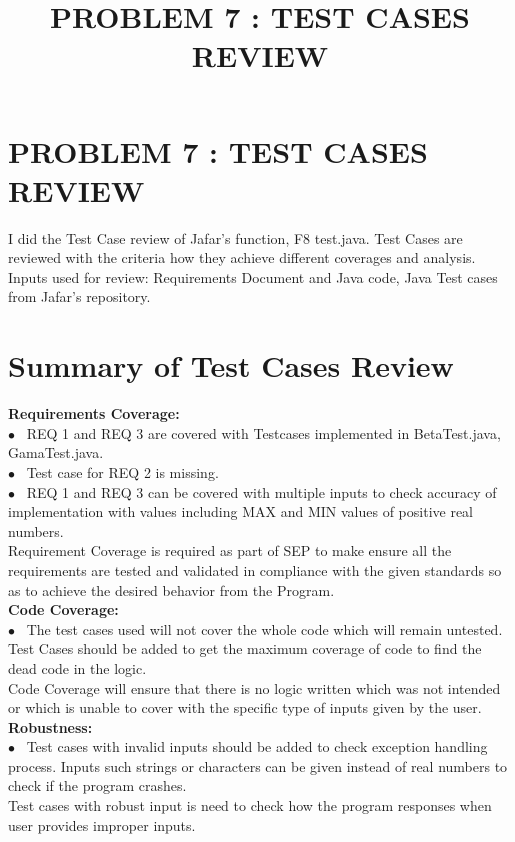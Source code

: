 \documentclass[10pt]{article}
\title{{\large\textbf{\normalsize PROBLEM 7 : TEST CASES REVIEW }}}
\begin{document}
\section*{{PROBLEM 7 : TEST CASES REVIEW}}
    I did the Test Case review of Jafar's function, F8 test.java. Test Cases are reviewed with the criteria how they achieve different coverages and analysis. 
Inputs used for review: Requirements Document and Java code, Java Test cases from Jafar's repository.


\section*{\normalsize Summary of Test Cases Review}

\textbf{Requirements Coverage: } 
\\$\bullet$~ 	REQ 1 and REQ 3 are covered with Testcases implemented in BetaTest.java, GamaTest.java. 
\\
$\bullet$~ 	Test case for REQ 2 is missing. 
\\
$\bullet$~	REQ 1 and REQ 3 can be covered with multiple inputs to check accuracy of implementation with values including MAX and MIN values of positive real numbers.
\\
 Requirement Coverage is required as part of SEP to make ensure all the requirements are tested and validated in compliance with the given standards so as to achieve the desired behavior from the Program.
\\

 \textbf{Code Coverage:} 
 \\$\bullet$~	The test cases used will not cover the whole code which will remain untested. Test Cases should be added to get the maximum coverage of code to find the dead code in the logic.
\\
Code Coverage will ensure that there is no logic written which was not intended or which is unable to cover with the specific type of inputs given by the user.
\\

 \textbf{Robustness:} \\
 $\bullet$~	Test cases with invalid inputs should be added to check exception handling process. Inputs such strings or characters can be given instead of real numbers to check if the program crashes.
\\
Test cases with robust input is need to check how the program responses when user provides improper inputs.
\\
\end{document}
